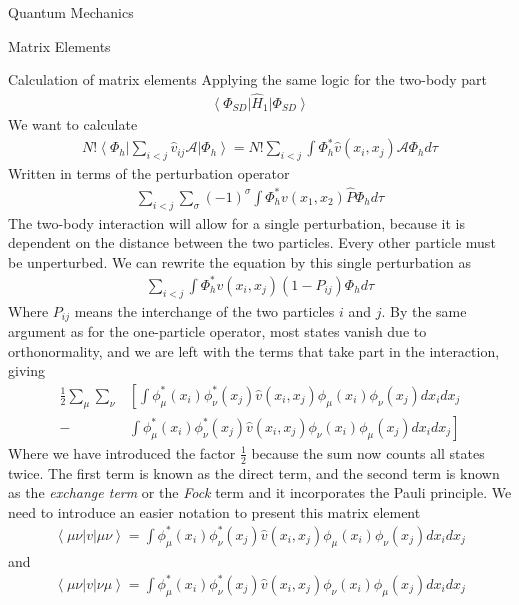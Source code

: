 \documentclass[twoside,english]{uiofysmaster}
\begin{document}
\begin{chapter}{Quantum Mechanics}
\begin{section}{Matrix Elements}
\begin{subsection}{Calculation of matrix elements}
			Applying the same logic for the two-body part
			\begin{align}
				\left< \Phi_{SD} \right| \hat H_1 \left| \Phi_{SD} \right>
			\end{align}
			We want to calculate 
			\begin{align}
				N! \left< \Phi_h \right| \sum_{i<j} \hat v_{ij} \mathcal{A} \left| \Phi_h \right> = N! \sum_{i<j} \int \Phi_h^* \hat v(x_i,x_j) \mathcal{A} \Phi_h d\tau
			\end{align}
			Written in terms of the perturbation operator
			\begin{align}
				\sum_{i<j} \sum_\sigma (-1)^\sigma \int \Phi_h^* v(x_1,x_2) \hat P \Phi_h d\tau
			\end{align}
			The two-body interaction will allow for a single perturbation, because it is dependent on the distance between the two particles. Every other particle must be unperturbed. We can rewrite the equation by this single perturbation as
			\begin{align} 
				\sum_{i<j} \int \Phi_h^* v(x_i,x_j) (1 - P_{ij}) \Phi_h d\tau
			\end{align}
			Where $P_{ij}$ means the interchange of the two particles $i$ and $j$. By the same argument as for the one-particle operator, most states vanish due to orthonormality, and we are left with the terms that take part in the interaction, giving
			\begin{align}
				\frac{1}{2} \sum_\mu \sum_\nu & \left[ \int \phi_\mu^*(x_i) \phi_\nu^*(x_j) \hat v(x_i,x_j) \phi_\mu(x_i) \phi_\nu(x_j) d x_i d x_j \right.  \\     -& \left. \int \phi_\mu^*(x_i) \phi_\nu^*(x_j) \hat v(x_i,x_j) \phi_\nu(x_i) \phi_\mu(x_j) d x_i d x_j \right]
			\end{align}
			Where we have introduced the factor $\frac{1}{2}$ because the sum now counts all states twice. The first term is known as the direct term, and the second term is known as the \textit{exchange term} or the \textit{Fock} term and it incorporates the Pauli principle. We need to introduce an easier notation to present this matrix element
			\begin{align}
				\left< \mu \nu | v | \mu \nu \right> = \int \phi_\mu^*(x_i) \phi_\nu^*(x_j) \hat v(x_i,x_j) \phi_\mu(x_i) \phi_\nu(x_j) d x_i d x_j
			\end{align}
			and 
			\begin{align}
				\left< \mu \nu | v | \nu \mu \right> = \int \phi_\mu^*(x_i) \phi_\nu^*(x_j) \hat v(x_i,x_j) \phi_\nu(x_i) \phi_\mu(x_j) d x_i d x_j

\end{align}
\end{subsection}
\end{section}
\end{chapter}
\end{document}
